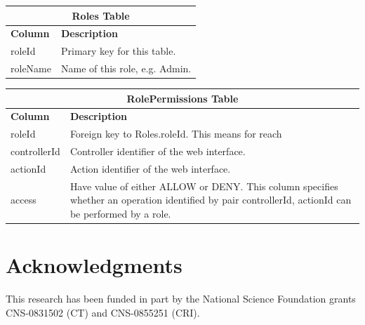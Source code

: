 \documentclass{sig-alternate}
\begin{document}
\begin{table}[h!]
\centering
\begin{tabular}{l p{6cm}}
\multicolumn{2}{c}{\bf Roles Table} \\ \hline
{\bf Column} & {\bf Description}\\ \hline
roleId & Primary key for this table.\\ \hline
roleName & Name of this role, e.g. Admin.\\ \hline
\end{tabular}
\end{table}

\begin{table}[h!]
\centering
\begin{tabular}{l p{6cm}}
\multicolumn{2}{c}{\bf RolePermissions Table} \\ \hline
{\bf Column} & {\bf Description}\\ \hline
roleId & Foreign key to Roles.roleId. This means for reach \\ \hline
controllerId & Controller identifier of the web interface.\\ \hline
actionId & Action identifier of the web interface.\\ \hline
access & Have value of either ALLOW or DENY. This column specifies whether an operation identified by pair {controllerId, actionId} can be performed by a role.\\ \hline
\end{tabular}
\end{table}

\clearpage

\small {\section*{Acknowledgments}

This research has been funded in part by the National Science
Foundation grants CNS-0831502 (CT) and CNS-0855251 (CRI).}

\small{


}
\end{document}
